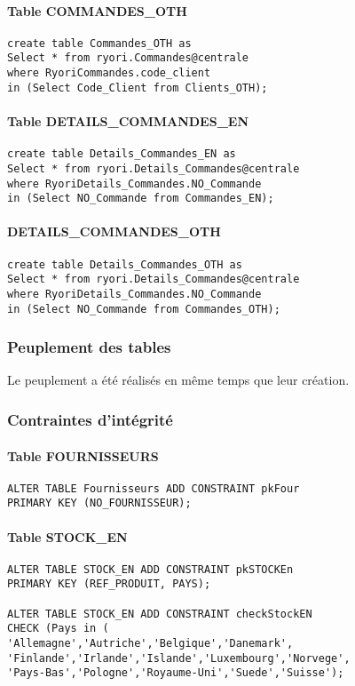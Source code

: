 \documentclass[10pt,a4paper,twoside]{article}
\begin{document}
\paragraph{Table COMMANDES\_OTH}
\begin{verbatim}
create table Commandes_OTH as
Select * from ryori.Commandes@centrale	
where RyoriCommandes.code_client 
in (Select Code_Client from Clients_OTH);
\end{verbatim}

\paragraph{Table DETAILS\_COMMANDES\_EN}
\begin{verbatim}
create table Details_Commandes_EN as
Select * from ryori.Details_Commandes@centrale
where RyoriDetails_Commandes.NO_Commande 
in (Select NO_Commande from Commandes_EN);
\end{verbatim}

\paragraph{DETAILS\_COMMANDES\_OTH}
\begin{verbatim}
create table Details_Commandes_OTH as
Select * from ryori.Details_Commandes@centrale
where RyoriDetails_Commandes.NO_Commande 
in (Select NO_Commande from Commandes_OTH);
\end{verbatim}
\subsubsection{Peuplement des tables}
Le peuplement a été réalisés en même temps que leur création.
\subsubsection{Contraintes d'intégrité}
\paragraph{Table FOURNISSEURS}
\begin{verbatim}
ALTER TABLE Fournisseurs ADD CONSTRAINT pkFour 
PRIMARY KEY (NO_FOURNISSEUR);
\end{verbatim}

\paragraph{Table STOCK\_EN}
\begin{verbatim}
ALTER TABLE STOCK_EN ADD CONSTRAINT pkSTOCKEn 
PRIMARY KEY (REF_PRODUIT, PAYS);

ALTER TABLE STOCK_EN ADD CONSTRAINT checkStockEN 
CHECK (Pays in (
'Allemagne','Autriche','Belgique','Danemark',
'Finlande','Irlande','Islande','Luxembourg','Norvege',
'Pays-Bas','Pologne','Royaume-Uni','Suede','Suisse');
\end{verbatim}
\end{document}

